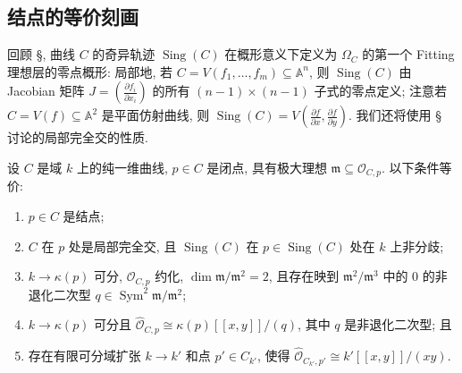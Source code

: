 \subsection{结点的等价刻画}\label{src:6.2.2-subsection}
回顾 \S{}, 曲线 $C$ 的奇异轨迹 $\operatorname{Sing}(C)$ 在概形意义下定义为 $\Omega_C$ 的第一个 Fitting 理想层的零点概形: 局部地, 若 $C=V(f_1,\allowbreak \ldots,\allowbreak f_m)\subseteq\mathbb A^n$, 则 $\operatorname{Sing}(C)$ 由 Jacobian 矩阵 $J=(\frac{\partial f_i}{\partial x_i})$ 的所有 $(n-1)\times(n-1)$ 子式的零点定义; 注意若 $C=V(f)\subseteq\mathbb A^2$ 是平面仿射曲线, 则 $\operatorname{Sing}(C)=V(\frac{\partial f}{\partial x},\allowbreak \frac{\partial f}{\partial y})$. 我们还将使用 \S{} 讨论的局部完全交的性质.
\begin{proposition}[结点的刻画]\label{src:6.2.4}
设 $C$ 是域 $k$ 上的纯一维曲线, $p\in C$ 是闭点, 具有极大理想 $\mathfrak m\subseteq\mathcal O_{C,\allowbreak p}$. 以下条件等价:
\begin{enumerate}[(1)]
\item $p\in C$ 是结点;
\item $C$ 在 $p$ 处是局部完全交, 且 $\operatorname{Sing}(C)$ 在 $p\in\operatorname{Sing}(C)$ 处在 $k$ 上非分歧;
\item $k\to\kappa(p)$ 可分, $\mathcal O_{C,\allowbreak p}$ 约化, $\dim\mathfrak m/\mathfrak m^2=2$, 且存在映到 $\mathfrak m^2/\mathfrak m^3$ 中的 $0$ 的非退化二次型 $q\in\operatorname{Sym}^2\mathfrak m/\mathfrak m^2$;
\item $k\to\kappa(p)$ 可分且 $\widehat{\mathcal O}_{C,\allowbreak p}\cong\kappa(p)[[x,\allowbreak y]]/(q)$, 其中 $q$ 是非退化二次型; 且
\item 存在有限可分域扩张 $k\to\allowbreak k'$ 和点 $p'\in C_{k'}$, 使得 $\widehat{\mathcal O}_{C_{k'},\allowbreak p'}\cong k'[[x,\allowbreak y]]/(xy)$.
\end{enumerate}
\end{proposition}

